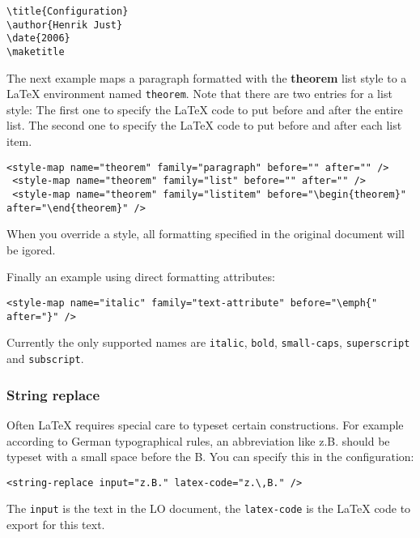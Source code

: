 \documentclass{article}
\newcommand\textstyleSourceText[1]{\texttt{\textmd{#1}}}
\begin{document}
\begin{verbatim}
\title{Configuration}
\author{Henrik Just}
\date{2006}
\maketitle
\end{verbatim}
{\mdseries
The next example maps a paragraph formatted with the \textbf{theorem} list style to a LaTeX environment named \textstyleSourceText{theorem}. Note that there are two entries for a list style: The first one to specify the LaTeX code to put before and after the entire list. The second one to specify the LaTeX code to put before and after each list item.}

\begin{verbatim}
<style-map name="theorem" family="paragraph" before="" after="" />
 <style-map name="theorem" family="list" before="" after="" />
 <style-map name="theorem" family="listitem" before="\begin{theorem}" after="\end{theorem}" />
\end{verbatim}
{\mdseries
When you override a style, all formatting specified in the original document will be igored.}

{\mdseries
Finally an example using direct formatting attributes:}

\begin{verbatim}
<style-map name="italic" family="text-attribute" before="\emph{" after="}" />
\end{verbatim}
{\mdseries
Currently the only supported names are \textstyleSourceText{italic}, \textstyleSourceText{bold}, \textstyleSourceText{small-caps}, \textstyleSourceText{superscript} and \textstyleSourceText{subscript}. }

\subsubsection[String replace]{String replace}
{\mdseries
Often LaTeX requires special care to typeset certain constructions. For example according to German typographical rules, an abbreviation like z.B. should be typeset with a small space before the B. You can specify this in the configuration:}

\begin{verbatim}
<string-replace input="z.B." latex-code="z.\,B." />
\end{verbatim}
{\mdseries
The \textstyleSourceText{input} is the text in the LO document, the \textstyleSourceText{latex-code} is the LaTeX code to export for this text.}
\end{document}
